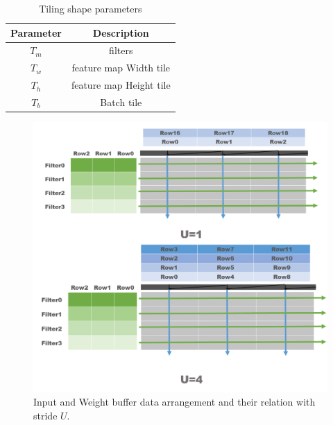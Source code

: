 \begin{table}[h]
    \caption{Tiling shape parameters}
    \label{tab:tile_shape}
    \centering
    \footnotesize 
        \begin{tabular}{cc}
        \toprule
        Parameter & Description \\
        \midrule
            $T_m$ & filters\\
            $T_w$ & feature map Width tile\\
            $T_h$ & feature map Height tile\\
            $T_b$ & Batch tile\\
        \bottomrule
        \end{tabular}
\end{table}
\begin{figure}[h]
    \centering
    \includegraphics[width=0.8\linewidth]{inc/4_proposed_architecture/figure/stride_buffer.png}
    \caption{Input and Weight buffer data arrangement and their relation with stride $U$.}
    \label{fig:stride_buffer}
\end{figure}
